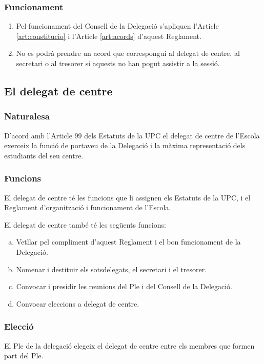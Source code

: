 \documentclass[a4paper,12pt]{article}
\renewcommand*{\thesubsubsection}{\arabic{subsubsection}}
\begin{document}
\subsubsection{Funcionament}
\begin{enumerate}[\thesubsubsection.1]
	\item Pel funcionament del Consell de la Delegació s'apliquen l'Article \ref{art:constitucio} i l'Article \ref{art:acords} d'aquest Reglament.
	\item No es podrà prendre un acord que correspongui al delegat de centre, al secretari o al tresorer si aquests no han pogut assistir a la sessió.
\end{enumerate}

\subsection{El delegat de centre}
\subsubsection{Naturalesa}
D'acord amb l'Article 99 dels Estatuts de la UPC el delegat de centre de l'Escola exerceix la funció de portaveu de la Delegació i la màxima representació dels estudiants del seu centre.

\subsubsection{Funcions}
El delegat de centre té les funcions que li assignen els Estatuts de la UPC, i el Reglament d'organització i funcionament de l'Escola.

El delegat de centre també té les següents funcions:
\begin{enumerate}[a)]
	\item Vetllar pel compliment d'aquest Reglament i el bon funcionament de la Delegació.
	\item Nomenar i destituir els sotsdelegats, el secretari i el tresorer.
	\item Convocar i presidir les reunions del Ple i del Consell de la Delegació.
	\item Convocar eleccions a delegat de centre.
\end{enumerate}

\subsubsection{Elecció}
El Ple de la delegació elegeix el delegat de centre entre els membres que formen part del Ple.
\end{document}
